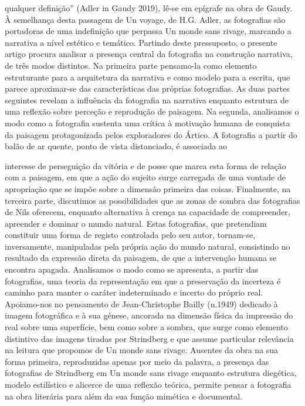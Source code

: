 \documentclass{article}
\begin{document}
qualquer definição” (Adler in Gaudy 2019), lê-se em epígrafe na obra de Gaudy. À
semelhança desta passagem de Un voyage, de H.G. Adler, as fotografias são portadoras de uma indefinição que perpassa Un monde sans rivage, marcando a narrativa
a nível estético e temático.
Partindo deste pressuposto, o presente artigo procura analisar a presença central da fotografia na construção narrativa, de três modos distintos. Na primeira parte
pensamo-la como elemento estruturante para a arquitetura da narrativa e como modelo para a escrita, que parece aproximar-se das características das próprias fotografias. As duas partes seguintes revelam a influência da fotografia na narrativa
enquanto estrutura de uma reflexão sobre perceção e reprodução de paisagem. Na
segunda, analisamos o modo como a fotografia sustenta uma crítica à motivação humana de conquista da paisagem protagonizada pelos exploradores do Ártico. A fotografia a partir do balão de ar quente, ponto de vista distanciado, é associada ao




interesse de perseguição da vitória e de posse que marca esta forma de relação com
a paisagem, em que a ação do sujeito surge carregada de uma vontade de apropriação
que se impõe sobre a dimensão primeira das coisas. Finalmente, na terceira parte,
discutimos as possibilidades que as zonas de sombra das fotografias de Nils oferecem,
enquanto alternativa à crença na capacidade de compreender, apreender e dominar
o mundo natural. Estas fotografias, que pretendiam constituir uma forma de registo
controlada pelo seu autor, tornam-se, inversamente, manipuladas pela própria ação
do mundo natural, consistindo no resultado da expressão direta da paisagem, de que
a intervenção humana se encontra apagada. Analisamos o modo como se apresenta,
a partir das fotografias, uma teoria da representação em que a preservação da incerteza é caminho para manter o caráter indeterminado e incerto do próprio real. Apoiamo-nos no pensamento de Jean-Christophe Bailly (n.1949) dedicado à imagem fotográfica e à sua génese, ancorada na dimensão física da impressão do real sobre
uma superfície, bem como sobre a sombra, que surge como elemento distintivo das
imagens tiradas por Strindberg e que assume particular relevância na leitura que
propomos de Un monde sans rivage.
Ausentes da obra na sua forma primeira, reproduzidas apenas por meio da palavra, a presença das fotografias de Strindberg em Un monde sans rivage enquanto
estrutura diegética, modelo estilístico e alicerce de uma reflexão teórica, permite
pensar a fotografia na obra literária para além da sua função mimética e documental.
\end{document}
